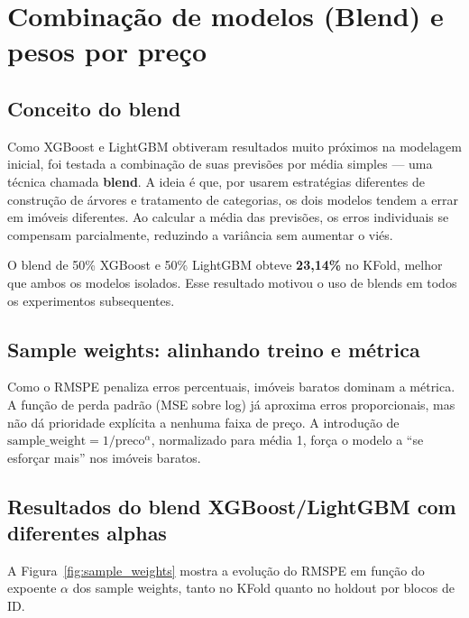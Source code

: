\documentclass[12pt,a4paper]{article}
\begin{document}
\section{Combinação de modelos (Blend) e pesos por preço}

\subsection{Conceito do blend}

Como XGBoost e LightGBM obtiveram resultados muito próximos na modelagem inicial, foi testada a combinação de suas previsões por média simples --- uma técnica chamada \textbf{blend}. A ideia é que, por usarem estratégias diferentes de construção de árvores e tratamento de categorias, os dois modelos tendem a errar em imóveis diferentes. Ao calcular a média das previsões, os erros individuais se compensam parcialmente, reduzindo a variância sem aumentar o viés.

O blend de 50\% XGBoost e 50\% LightGBM obteve \textbf{23,14\%} no KFold, melhor que ambos os modelos isolados. Esse resultado motivou o uso de blends em todos os experimentos subsequentes.

\subsection{Sample weights: alinhando treino e métrica}

Como o RMSPE penaliza erros percentuais, imóveis baratos dominam a métrica. A função de perda padrão (MSE sobre log) já aproxima erros proporcionais, mas não dá prioridade explícita a nenhuma faixa de preço. A introdução de $\text{sample\_weight} = 1 / \text{preco}^\alpha$, normalizado para média 1, força o modelo a ``se esforçar mais'' nos imóveis baratos.

\subsection{Resultados do blend XGBoost/LightGBM com diferentes alphas}

A Figura~\ref{fig:sample_weights} mostra a evolução do RMSPE em função do expoente $\alpha$ dos sample weights, tanto no KFold quanto no holdout por blocos de ID.
\end{document}
